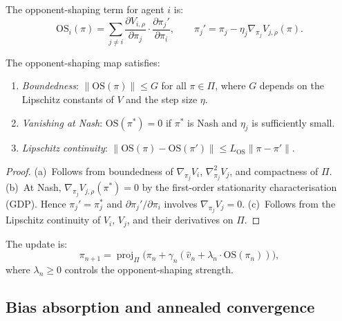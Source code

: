 \begin{definition}
\label{def:os-ch3}
The opponent-shaping term for agent $i$ is:
\begin{equation}
    \mathrm{OS}_i(\pi) = \sum_{j \neq i} \frac{\partial V_{i,\rho}}{\partial \pi_j} \cdot \frac{\partial \pi_j'}{\partial \pi_i}, \qquad \pi_j' = \pi_j - \eta_j \nabla_{\pi_j} V_{j,\rho}(\pi).
\end{equation}
\end{definition}

\begin{lemma}[Properties of OS]
\label{lem:os-properties}
The opponent-shaping map satisfies:
\begin{enumerate}[label=(\alph*)]
    \item \emph{Boundedness}: $\|\mathrm{OS}(\pi)\| \leq G$ for all $\pi \in \Pi$, where $G$ depends on the Lipschitz constants of $V$ and the step size $\eta$.
    \item \emph{Vanishing at Nash}: $\mathrm{OS}(\pi^*) = 0$ if $\pi^*$ is Nash and $\eta_j$ is sufficiently small.
    \item \emph{Lipschitz continuity}: $\|\mathrm{OS}(\pi) - \mathrm{OS}(\pi')\| \leq L_{\mathrm{OS}} \|\pi - \pi'\|$.
\end{enumerate}
\end{lemma}

\begin{proof}
(a)~Follows from boundedness of $\nabla_{\pi_j} V_i$, $\nabla^2_{\pi_j} V_j$, and compactness of $\Pi$.
(b)~At Nash, $\nabla_{\pi_j} V_{j,\rho}(\pi^*) = 0$ by the first-order stationarity characterisation (GDP). Hence $\pi_j' = \pi_j^*$ and $\partial \pi_j' / \partial \pi_i$ involves $\nabla_{\pi_j} V_j = 0$.
(c)~Follows from the Lipschitz continuity of $V_i$, $V_j$, and their derivatives on $\Pi$.
\end{proof}

\begin{definition}[LOLA-PG]
The update is:
\begin{equation}
\tag{LOLA-PG}
    \pi_{n+1} = \operatorname{proj}_\Pi\bigl(\pi_n + \gamma_n(\hat{v}_n + \lambda_n \cdot \mathrm{OS}(\pi_n))\bigr),
\end{equation}
where $\lambda_n \geq 0$ controls the opponent-shaping strength.
\end{definition}


\subsection{Bias absorption and annealed convergence}

